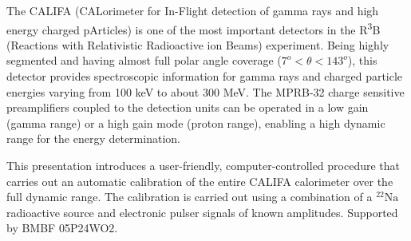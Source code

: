 \documentclass{scdpg}
\begin{document}
\begin{scAbstract}
{}
\scBeginText
The CALIFA (CALorimeter for In-Flight detection of gamma rays and high energy charged pArticles) is one of the most important detectors in the R\textsuperscript{3}B (Reactions with Relativistic Radioactive ion Beams) experiment. Being highly segmented and having almost full polar angle coverage ($7^{o} < \theta < 143^{o}$), this detector provides spectroscopic information for gamma rays and charged particle energies varying from 100 keV to about 300 MeV. The MPRB-32 charge sensitive preamplifiers coupled to the detection units can be operated in a low gain (gamma range) or a high gain mode (proton range), enabling a high dynamic range for the energy determination.

This presentation introduces a user-friendly, computer-controlled procedure that carries out an automatic calibration of the entire CALIFA calorimeter over the full dynamic range. The calibration is carried out using a combination of a $^{22}\mathrm{Na}$ radioactive source and electronic pulser signals of known amplitudes.
\newline
Supported by BMBF 05P24WO2.
\scEndText
{}
\end{scAbstract}
\end{document}
